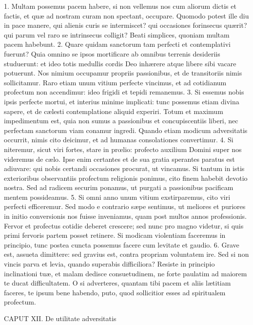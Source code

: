 1. Multam possemus pacem habere, si non vellemus nos cum aliorum dictis et factis, et quæ ad nostram curam non spectant, occupare. Quomodo potest ille diu in pace manere, qui alienis curis se intermiscet? qui occasiones forinsecus quærit? qui parum vel raro se intrinsecus colligit? Beati simplices, quoniam multam pacem habebunt.
2. Quare quidam sanctorum tam perfecti et contemplativi fuerunt? Quia omnino se ipsos mortificare ab omnibus terrenis desideriis studuerunt: et ideo totis medullis cordis Deo inhærere atque libere sibi vacare potuerunt. Nos nimium occupamur propriis passionibus, et de transitoriis nimis sollicitamur. Raro etiam unum vitium perfecte vincimus, et ad cotidianum profectum non accendimur: ideo frigidi et tepidi remanemus.
3. Si essemus nobis ipsis perfecte mortui, et interius minime implicati: tunc possemus etiam divina sapere, et de cælesti contemplatione aliquid experiri. Totum et maximum impedimentum est, quia non sumus a passionibus et concupiscentiis liberi, nec perfectam sanctorum viam conamur ingredi. Quando etiam modicum adversitatis occurrit, nimis cito deicimur, et ad humanas consolationes convertimur.
4. Si niteremur, sicut viri fortes, stare in prœlio: profecto auxilium Domini super nos videremus de cælo. Ipse enim certantes et de sua gratia sperantes paratus est adiuvare: qui nobis certandi occasiones procurat, ut vincamus. Si tantum in istis exterioribus observantiis profectum religionis ponimus, cito finem habebit devotio nostra. Sed ad radicem securim ponamus, ut purgati a passionibus pacificam mentem possideamus.
5. Si omni anno unum vitium exstirparemus, cito viri perfecti efficeremur. Sed modo e contrario sæpe sentimus, ut meliores et puriores in initio conversionis nos fuisse inveniamus, quam post multos annos professionis. Fervor et profectus cotidie deberet crescere; sed nunc pro magno videtur, si quis primi fervoris partem posset retinere. Si modicam violentiam faceremus in principio, tunc postea cuncta possemus facere cum levitate et gaudio.
6. Grave est, assueta dimittere: sed gravius est, contra propriam voluntatem ire. Sed si non vincis parva et levia, quando superabis difficiliora? Resiste in principio inclinationi tuæ, et malam dedisce consuetudinem, ne forte paulatim ad maiorem te ducat difficultatem. O si adverteres, quantam tibi pacem et aliis lætitiam faceres, te ipsum bene habendo, puto, quod sollicitior esses ad spiritualem profectum.


CAPUT XII.
De utilitate adversitatis

